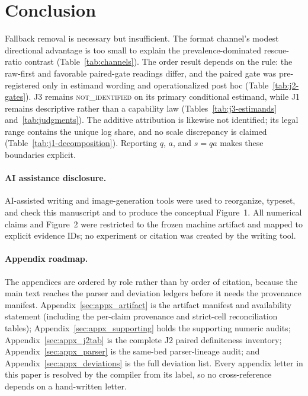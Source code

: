 \documentclass{article}
\begin{document}
\section{Conclusion}
\label{sec:conclusion}

Fallback removal is necessary but insufficient.  The format channel's modest
directional advantage is too small to explain the prevalence-dominated
rescue-ratio contrast (Table~\ref{tab:channels}).  The order result depends on
the rule: the raw-first and favorable paired-gate readings differ, and the
paired gate was pre-registered only in estimand wording and operationalized
post hoc (Table~\ref{tab:j2-gates}).  J3 remains
\textsc{not\_identified} on its primary conditional estimand, while J1 remains
descriptive rather than a capability law (Tables~\ref{tab:j3-estimands}
and~\ref{tab:judgments}).  The additive attribution is likewise not
identified; its legal range contains the unique log share, and no scale
discrepancy is claimed (Table~\ref{tab:j1-decomposition}).  Reporting $q$,
$a$, and $s=qa$ makes these boundaries explicit.


\label{p5:main-text-end}


\paragraph{AI assistance disclosure.}
AI-assisted writing and image-generation tools were used to reorganize,
typeset, and check this manuscript and to produce the conceptual Figure~1.
All numerical claims and Figure~2 were restricted to the frozen machine
artifact and mapped to explicit evidence IDs; no experiment or citation was
created by the writing tool.

\appendix
\raggedbottom

\paragraph{Appendix roadmap.}
The appendices are ordered by role rather than by order of citation, because the
main text reaches the parser and deviation ledgers before it needs the provenance
manifest.  Appendix~\ref{sec:appx_artifact} is the artifact manifest and
availability statement (including the per-claim provenance and strict-cell
reconciliation tables); Appendix~\ref{sec:appx_supporting} holds the supporting
numeric audits; Appendix~\ref{sec:appx_j2tab} is the complete J2 paired
definiteness inventory; Appendix~\ref{sec:appx_parser} is the same-bed
parser-lineage audit; and Appendix~\ref{sec:appx_deviations} is the full
deviation list.  Every appendix letter in this paper is resolved by the
compiler from its label, so no cross-reference depends on a hand-written letter.
\end{document}
